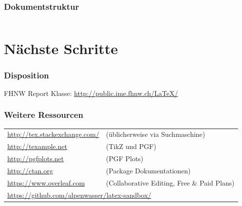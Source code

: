 \documentclass{beamer}                %
\begin{document}
\begin{frame}[fragile] %
    \frametitle{Dokumentstruktur}

    \inputminted{tex}{code/structure.tex}
\end{frame}


\section<handout:0>{N\"achste Schritte} %

\begin{frame} %
    \frametitle{Disposition}

    FHNW Report Klasse: 
    \alert{%
        \href{http://public.ime.fhnw.ch/LaTeX/}
        {http://public.ime.fhnw.ch/LaTeX/}}\\


\end{frame}

\begin{frame} %
    \frametitle{Weitere Ressourcen}

    {\footnotesize\selectfont
    \begin{tabular}{ll}
        \href{http://tex.stackexchange.com/}{http://tex.stackexchange.com/} &
        (\"ublicherweise via Suchmaschine)                                  \\[2mm]

        \href{http://texample.net}{http://texample.net}                     &
        (TikZ und PGF)                                                      \\[2mm]

        \href{http://pgfplots.net}{http://pgfplots.net}                     &
        (PGF Plots)                                                         \\[2mm]

        \href{http://ctan.org/}{http://ctan.org}                            &
        (Package Dokumentationen)                                           \\[2mm]

        \href{https://www.overleaf.com}{https://www.overleaf.com}           &
        (Collaborative Editing, Free \& Paid Plans)                         \\[2mm]

        \multicolumn{2}{l}{%
            \href{https://github.com/alpenwasser/latex-sandbox/}
                {https://github.com/alpenwasser/latex-sandbox/}} \\
    \end{tabular}}
\end{frame}
\end{document}
